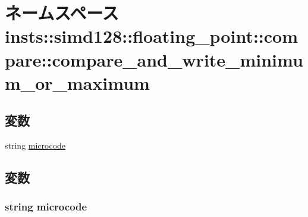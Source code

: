 \hypertarget{namespaceinsts_1_1simd128_1_1floating__point_1_1compare_1_1compare__and__write__minimum__or__maximum}{
\section{ネームスペース insts::simd128::floating\_\-point::compare::compare\_\-and\_\-write\_\-minimum\_\-or\_\-maximum}
\label{namespaceinsts_1_1simd128_1_1floating__point_1_1compare_1_1compare__and__write__minimum__or__maximum}
}
\subsection*{変数}
\begin{DoxyCompactItemize}
\item 
string \hyperlink{namespaceinsts_1_1simd128_1_1floating__point_1_1compare_1_1compare__and__write__minimum__or__maximum_a770f11a173e99389a8802f0107ed8f52}{microcode}
\end{DoxyCompactItemize}


\subsection{変数}
\hypertarget{namespaceinsts_1_1simd128_1_1floating__point_1_1compare_1_1compare__and__write__minimum__or__maximum_a770f11a173e99389a8802f0107ed8f52}{
\subsubsection[{microcode}]{\setlength{\rightskip}{0pt plus 5cm}string {\bf microcode}}}
\label{namespaceinsts_1_1simd128_1_1floating__point_1_1compare_1_1compare__and__write__minimum__or__maximum_a770f11a173e99389a8802f0107ed8f52}
